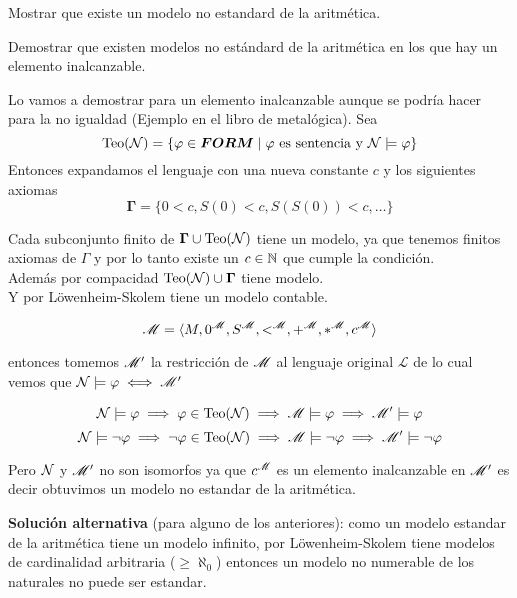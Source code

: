\documentclass[leqno, 12pt, twoside,letterpaper]{book}
\begin{document}
\begin{ej}{1}
    Mostrar que existe un modelo no estandard de la aritmética.
\end{ej}

\begin{ej}{1}
    Demostrar que existen modelos no estándard de la aritmética en los que hay
    un elemento inalcanzable.
\end{ej}

\begin{solucion}
\begin{dem}
	Lo vamos a demostrar para un elemento inalcanzable aunque se podría hacer para la no igualdad (Ejemplo en el libro de metalógica). Sea
	 \[\mbox{Teo}(\mathcal{N}) = \{ \varphi \in \bm{FORM} \mid  \varphi \mbox{ es sentencia y } \mathcal{N} \models \varphi \}\]
\noindent Entonces expandamos el lenguaje con una nueva constante $c$ y los siguientes axiomas
 \[ \bm{\Gamma} = \{ 0 < c, S(0) < c, S(S(0)) < c, \dots \} \]

\noindent Cada subconjunto finito de $\bm{\Gamma} \cup \mbox{Teo}(\mathcal{N})$ tiene un modelo, ya que tenemos finitos axiomas de $\Gamma$ y por lo tanto existe un $c \in \mathbb{N}$ que cumple la condición.\\
\noindent Además por compacidad $\mbox{Teo}(\mathcal{N}) \cup \bm{\Gamma}$ tiene modelo. \\
\noindent Y por Löwenheim-Skolem tiene un modelo contable.

	\[ \mathscr{M} = \langle M, 0^{\mathscr{M}}, S^{\mathscr{M}}, <^{\mathscr{M}}, +^{\mathscr{M}}, *^{\mathscr{M}}, c^{\mathscr{M}} \rangle \]

\noindent entonces tomemos $\mathscr{M}'$ la restricción de $\mathscr{M}$ al lenguaje original $\mathcal{L}$ de lo cual vemos que $\mathcal{N} \models \varphi \iff \mathscr{M}' $

\[ \mathcal{N} \models \varphi \implies \varphi \in \mbox{Teo}(\mathcal{N}) \implies \mathscr{M} \models \varphi \implies \mathscr{M}' \models \varphi \]
\[ \mathcal{N} \models \lnot\varphi \implies \lnot\varphi \in \mbox{Teo}(\mathcal{N}) \implies \mathscr{M} \models \lnot\varphi \implies \mathscr{M}' \models \lnot\varphi \]

\noindent Pero $\mathcal{N}$ y $\mathscr{M}'$ no son isomorfos ya que $c^{\mathscr{M}}$ es un elemento inalcanzable en $\mathscr{M}'$ es decir obtuvimos un modelo no estandar de la aritmética.

\end{dem}
\end{solucion}

\begin{solucion}

\textbf{Solución alternativa} (para alguno de los anteriores):
como un modelo estandar de la aritmética tiene un modelo infinito, por Löwenheim-Skolem tiene modelos de cardinalidad arbitraria ($\geq \aleph_0$) entonces un modelo no numerable de los naturales no puede ser estandar.

\end{solucion}
\end{document}
